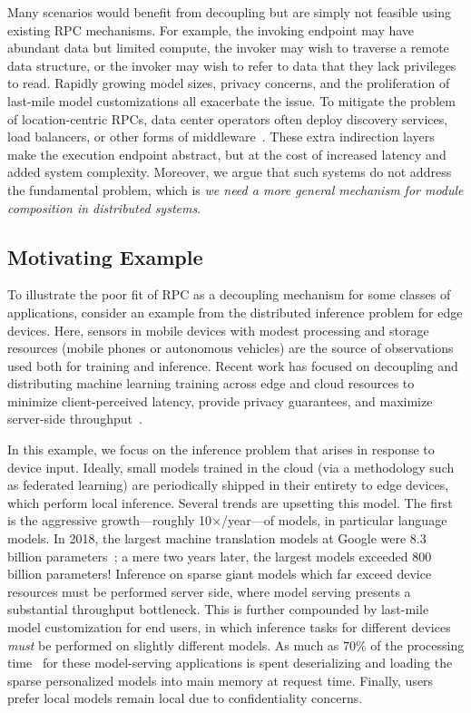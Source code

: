 Many scenarios would benefit from decoupling but are simply not feasible using existing RPC
mechanisms. For example, the invoking endpoint may have abundant data but limited
compute, the invoker may wish to traverse a remote data structure, or the invoker may wish to
refer to data that they lack privileges to read. Rapidly growing model sizes, privacy concerns, and the proliferation of last-mile
model customizations all exacerbate the issue.
To mitigate the problem of location-centric RPCs, data center
operators often deploy discovery services, load balancers, or other
forms of middleware~\cite{eisenbud16,katran,tibco,kreps11,mq}. These
extra indirection layers make the execution endpoint abstract, but at
the cost of increased latency and added system complexity. Moreover,
we argue that such systems do not address the fundamental problem,
which is \emph{we need a more general mechanism for module
    composition in distributed systems}.

\subsection*{Motivating Example}

To illustrate the poor fit of RPC as a decoupling mechanism for some classes of applications,
consider an example from the distributed inference problem for edge devices. Here,
sensors in mobile devices with modest processing and storage resources (\eg mobile phones
or autonomous vehicles) are the source of observations used both for training and inference.
Recent work has focused on decoupling and distributing machine learning training across edge
and cloud resources to minimize client-perceived latency, provide privacy guarantees, and
maximize server-side throughput~\cite{federatedml,singh2019detailed}.

In this example, we focus on the inference problem that arises in response to device input.
Ideally, small models trained in the
cloud (via a methodology such as federated learning) are periodically shipped in their entirety to
edge devices, which perform local inference.  Several trends are upsetting this model. The first
is the aggressive growth---roughly 10$\times$/year---of models, in particular language models.
In 2018, the largest machine translation models at Google were 8.3 billion
parameters~\cite{megatron}; a mere two years later, the largest models exceeded 800 billion parameters!
Inference on sparse giant models which far exceed device resources must be performed server
side, where model serving presents a substantial throughput bottleneck. This is further
compounded by last-mile model customization for end users, in which inference tasks
for different devices \emph{must} be performed on slightly different models.  As much as 70\%
of the processing time~\cite{trims} for these model-serving applications is spent deserializing
and loading the sparse personalized models into main memory at request time. Finally, users prefer
local models remain local due to confidentiality concerns.

